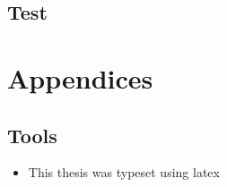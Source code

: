 \documentclass{these-dbl}
\begin{document}
\cite{YangEtAl2022}
\printbibliography%


\chapter{Test}
\cite{AlessioBemporad2009}
\cite{YangEtAl2022}
\printbibliography%


\appendix
\part{Appendices}
\chapter{Tools}
\begin{itemize}
  \item This thesis was typeset using \gls{latex}

\end{itemize}




\makebackcover
\end{document}
